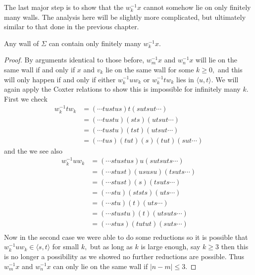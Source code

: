 \documentclass[class=book, crop=false]{standalone}
\begin{document}
The last major step is to show that the $w_k^{-1}x$ cannot somehow lie on only finitely many walls. The analysis here will be slightly more complicated, but ultimately similar to that done in the previous chapter.

\begin{lemma}
	\label{336f2finitewalls}
	Any wall of $\Sigma$ can contain only finitely many $w_k^{-1}x.$
\end{lemma}
\begin{proof}
	By arguments identical to those before, $w_m^{-1}x$ and $w_{n}^{-1}x$ will lie on the same wall if and only if $x$ and $v_k$ lie on the same wall for some $k\ge 0,$ and this will only happen if and only if either $w_k^{-1}uw_k$ or $w_k^{-1}tw_k$ lies in $\langle u,t\rangle.$ We will again apply the Coxter relations to show this is impossible for infinitely many $k.$ First we check
\begin{align*}
	w_k^{-1}tw_k&=(\cdots tustus)t(sutsut\cdots)\\
		    &=(\cdots tustu)(sts)(utsut\cdots)\\
		    &=(\cdots tustu)(tst)(utsut\cdots)\\
		    &=(\cdots tus)(tut)(s)(tut)(sut\cdots)
\end{align*}
and the we see also
\begin{align*}
	w_k^{-1}uw_k&=(\cdots stustus)u(sutsuts\cdots)\\
		    &=(\cdots stust)(ususu)(tsuts\cdots)\\
		    &=(\cdots stust)(s)(tsuts\cdots)\\
		    &=(\cdots stu)(ststs)(uts\cdots)\\
		    &=(\cdots stu)(t)(uts\cdots)\\
		    &=(\cdots stustu)(t)(utsuts\cdots)\\
		    &=(\cdots stus)(tutut)(suts\cdots)\\
\end{align*}
Now in the second case we were able to do some reductions so it is possible that $w_{k}^{-1}uw_k\in \langle s,t \rangle$ for small $k,$ but as long as $k$ is large enough, say $k\ge 3$ then this is no longer a possibility as we showed no further reductions are possible. Thus $w_m^{-1}x$ and $w_n^{-1}x$ can only lie on the same wall if $|n-m|\le 3.$

\end{proof}
\end{document}
